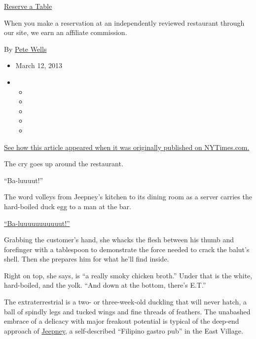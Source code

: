\href{http://www.opentable.com/single.aspx?ref=4201\&rid=103108}{Reserve
a Table}

When you make a reservation at an independently reviewed restaurant
through our site, we earn an affiliate commission.

By \href{https://www.nytimes3xbfgragh.onion/by/pete-wells}{Pete Wells}

\begin{itemize}
\item
  March 12, 2013
\item
  \begin{itemize}
  \item
  \item
  \item
  \item
  \item
  \end{itemize}
\end{itemize}

\href{https://archive.nytimes3xbfgragh.onion/www.nytimes3xbfgragh.onion/2013/03/13/dining/reviews/restaurant-review-jeepney-in-the-east-village-pig-and-khao-on-the-lower-east-side.html}{See
how this article appeared when it was originally published on
NYTimes.com.}

The cry goes up around the restaurant.

``Ba-luuuut!''

The word volleys from Jeepney's kitchen to its dining room as a server
carries the hard-boiled duck egg to a man at the bar.

\href{http://www.nytimes3xbfgragh.onion/video/2013/03/11/multimedia/100000002110714/filipino-egg.html\#media/vid1}{``Ba-luuuuuuuuuuut!''}

Grabbing the customer's hand, she whacks the flesh between his thumb and
forefinger with a tablespoon to demonstrate the force needed to crack
the balut's shell. Then she prepares him for what he'll find inside.

Right on top, she says, is ``a really smoky chicken broth.'' Under that
is the white, hard-boiled, and the yolk. ``And down at the bottom,
there's E.T.''

The extraterrestrial is a two- or three-week-old duckling that will
never hatch, a ball of spindly legs and tucked wings and fine threads of
feathers. The unabashed embrace of a delicacy with major freakout
potential is typical of the deep-end approach of
\href{http://www.jeepneynyc.com/}{Jeepney}, a self-described ``Filipino
gastro pub'' in the East Village.

